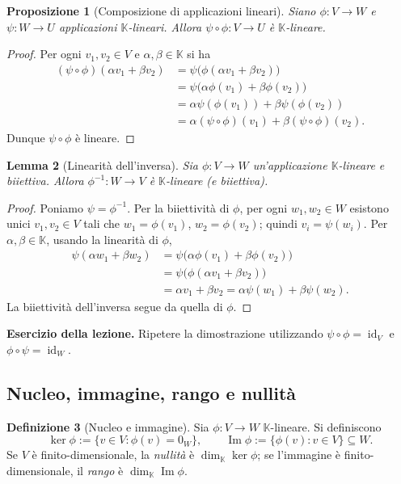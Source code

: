 \documentclass[11pt,a4paper]{article}
\newcommand{\KK}{\mathbb{K}}
\theoremstyle{plain}
\newtheorem{prop}{Proposizione}[section]
\newtheorem{lemma}[prop]{Lemma}
\theoremstyle{definition}
\newtheorem{defn}[prop]{Definizione}
\theoremstyle{remark}
\begin{document}
\begin{prop}[Composizione di applicazioni lineari]
Siano $\phi:V\to W$ e $\psi:W\to U$ applicazioni $\KK$-lineari. Allora
$\psi\circ\phi:V\to U$ è $\KK$-lineare.
\end{prop}
\begin{proof}
Per ogni $v_1,v_2\in V$ e $\alpha,\beta\in\KK$ si ha
\begin{align*}
 (\psi\circ\phi)(\alpha v_1+\beta v_2)
 &=\psi\bigl(\phi(\alpha v_1+\beta v_2)\bigr)\\
 &=\psi\bigl(\alpha\phi(v_1)+\beta\phi(v_2)\bigr)\\
 &=\alpha\psi(\phi(v_1))+\beta\psi(\phi(v_2))\\
 &=\alpha(\psi\circ\phi)(v_1)+\beta(\psi\circ\phi)(v_2).
\end{align*}
Dunque $\psi\circ\phi$ è lineare.
\end{proof}

\begin{lemma}[Linearità dell'inversa]
Sia $\phi:V\to W$ un'applicazione $\KK$-lineare e biiettiva. Allora
$\phi^{-1}:W\to V$ è $\KK$-lineare (e biiettiva).
\end{lemma}
\begin{proof}
Poniamo $\psi=\phi^{-1}$. Per la biiettività di $\phi$, per ogni
$w_1,w_2\in W$ esistono unici $v_1,v_2\in V$ tali che
$w_1=\phi(v_1)$, $w_2=\phi(v_2)$; quindi $v_i=\psi(w_i)$.
Per $\alpha,\beta\in\KK$, usando la linearità di $\phi$,
\begin{align*}
 \psi(\alpha w_1+\beta w_2)
 &=\psi\bigl(\alpha\phi(v_1)+\beta\phi(v_2)\bigr)\\
 &=\psi\bigl(\phi(\alpha v_1+\beta v_2)\bigr)\\
 &=\alpha v_1+\beta v_2
 =\alpha\psi(w_1)+\beta\psi(w_2).
\end{align*}
La biiettività dell'inversa segue da quella di $\phi$.
\end{proof}

\noindent\textbf{Esercizio della lezione.} Ripetere la dimostrazione utilizzando
$\psi\circ\phi=\operatorname{id}_V$ e
$\phi\circ\psi=\operatorname{id}_W$.

\subsection{Nucleo, immagine, rango e nullità}

\begin{defn}[Nucleo e immagine]
Sia $\phi:V\to W$ $\KK$-lineare. Si definiscono
\[
 \ker\phi:=\{v\in V:\phi(v)=0_W\},\qquad
 \operatorname{Im}\phi:=\{\phi(v):v\in V\}\subseteq W.
\]
Se $V$ è finito-dimensionale, la \emph{nullità} è
$\dim_{\KK}\ker\phi$; se l'immagine è finito-dimensionale, il
\emph{rango} è $\dim_{\KK}\operatorname{Im}\phi$.
\end{defn}
\end{document}
